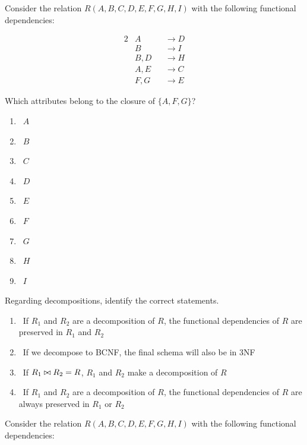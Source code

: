 \documentclass{bdad}
\begin{document}
Consider the relation $R (A, B, C, D, E, F, G, H, I)$ with the following functional dependencies:

\begin{alignat*}{2}
    & A    && \rightarrow D \\
    & B    && \rightarrow I \\
    & B, D && \rightarrow H \\
    & A, E && \rightarrow C \\
    & F, G && \rightarrow E 
\end{alignat*}

Which attributes belong to the closure of $\{A, F, G\}$?

\begin{enumerate}
    \item \boxedgreencheckmark~$A$
    \item \boxedredcross      ~$B$
    \item \boxedgreencheckmark~$C$
    \item \boxedgreencheckmark~$D$
    \item \boxedgreencheckmark~$E$
    \item \boxedgreencheckmark~$F$
    \item \boxedgreencheckmark~$G$
    \item \boxedredcross      ~$H$
    \item \boxedredcross      ~$I$
\end{enumerate}

Regarding decompositions, identify the correct statements.

\begin{enumerate}
    \item \boxedredcross~If $R_1$ and $R_2$ are a decomposition of $R$, the functional dependencies of $R$ are preserved in $R_1$ and $R_2$
    \item \boxedgreencheckmark~If we decompose to BCNF, the final schema will also be in 3NF
    \item \boxedgreencheckmark~If $R_1 \bowtie R_2=R$, $R_1$ and $R_2$ make a decomposition of $R$
    \item \boxedredcross~If $R_1$ and $R_2$ are a decomposition of $R$, the functional dependencies of $R$ are always preserved in $R_1$ or $R_2$
\end{enumerate}

\newpage
{}
Consider the relation $R (A, B, C, D, E, F, G, H, I)$ with the following functional dependencies:
\end{document}
